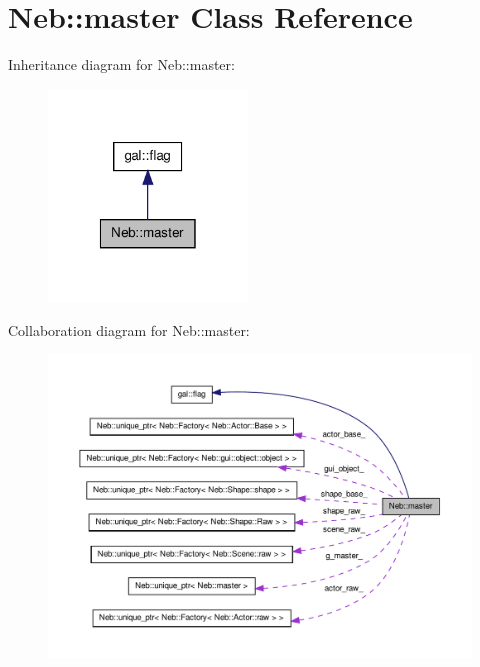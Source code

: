 \hypertarget{classNeb_1_1master}{\section{\-Neb\-:\-:master \-Class \-Reference}
\label{classNeb_1_1master}
}


\-Inheritance diagram for \-Neb\-:\-:master\-:\nopagebreak
\begin{figure}[H]
\begin{center}
\leavevmode
\includegraphics[width=150pt]{classNeb_1_1master__inherit__graph}
\end{center}
\end{figure}


\-Collaboration diagram for \-Neb\-:\-:master\-:
\nopagebreak
\begin{figure}[H]
\begin{center}
\leavevmode
\includegraphics[width=350pt]{classNeb_1_1master__coll__graph}
\end{center}
\end{figure}
